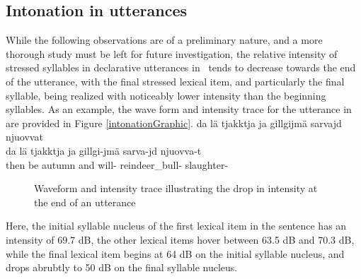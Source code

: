 \subsection{Intonation in utterances}\label{utteranceIntonation}
While the following observations are of a preliminary nature, and a more thorough study must be left for future investigation, the relative intensity of stressed syllables in declarative utterances in \PS\ tends to decrease towards the end of the utterance, with the final stressed lexical item, and particularly the final syllable, being realized with noticeably lower intensity than the beginning syllables. As an example, the wave form and intensity trace for the utterance in  are provided in Figure \vref{intonationGraphic}. %
\ea\label{intonationDropEx}
\glll	da lä tjakktja ja gillgijmä sarvajd njuovvat\\
	da lä tjakktja ja gillgi-jmä sarva-jd njuovva-t\\
	then be\BS{} autumn\BS{} and will- reindeer\_bull- slaughter-\\\nopagebreak
{} 
\z 
\setlength\fboxrule{0pt}
\begin{figure}
\caption{Waveform and intensity trace illustrating the drop in intensity at the end of an utterance}\label{intonationGraphic}
\end{figure}
Here, the initial syllable nucleus of the first lexical item in the sentence 
 has an intensity of 69.7 dB, the other lexical items hover between 63.5 dB and 70.3 dB, while the final lexical item  begins at 64 dB on the initial syllable nucleus, and drops abrubtly to 50 dB on the final syllable nucleus. 



